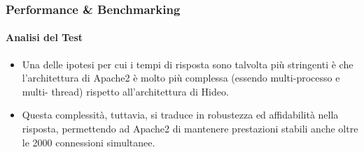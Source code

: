 \documentclass{beamer}
\begin{document}
\begin{frame}
\frametitle{Performance \& Benchmarking}
\framesubtitle{Analisi del Test}

\begin{itemize}
\item Una delle ipotesi per cui i tempi di risposta sono talvolta più stringenti è che
l’architettura di Apache2 è molto più complessa (essendo multi-processo e multi-
thread) rispetto all’architettura di Hideo.
\item Questa complessità, tuttavia, si traduce in robustezza ed affidabilità nella risposta,
permettendo ad Apache2 di mantenere prestazioni stabili anche oltre le 2000
connessioni simultanee.
\end{itemize}
\end{frame}
\end{document}
